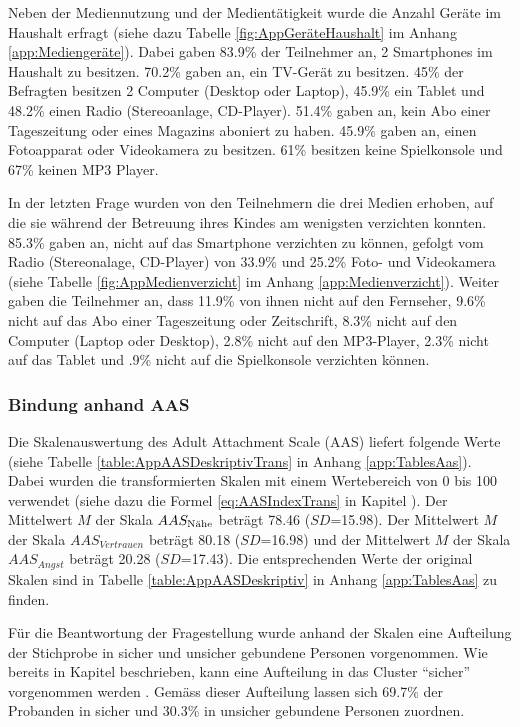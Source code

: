 Neben der Mediennutzung und der Medientätigkeit wurde die Anzahl Geräte im Haushalt erfragt (siehe dazu Tabelle \ref{fig:AppGeräteHaushalt} im Anhang \ref{app:Mediengeräte}). Dabei gaben 83.9\% der Teilnehmer an, 2 Smartphones im Haushalt zu besitzen. 70.2\% gaben an, ein TV-Gerät zu besitzen. 45\% der Befragten besitzen 2 Computer (Desktop oder Laptop), 45.9\% ein Tablet und 48.2\% einen Radio (Stereoanlage, CD-Player). 51.4\% gaben an, kein Abo einer Tageszeitung oder eines Magazins aboniert zu haben. 45.9\% gaben an, einen Fotoapparat oder Videokamera zu besitzen. 61\% besitzen keine Spielkonsole und 67\% keinen MP3 Player.

In der letzten Frage wurden von den Teilnehmern die drei Medien erhoben, auf die sie während der Betreuung ihres Kindes am wenigsten verzichten konnten. 85.3\% gaben an, nicht auf das Smartphone verzichten zu können, gefolgt vom Radio (Stereonalage, CD-Player) von 33.9\% und 25.2\% Foto- und Videokamera (siehe Tabelle \ref{fig:AppMedienverzicht} im Anhang \ref{app:Medienverzicht}). Weiter gaben die Teilnehmer an, dass 11.9\% von ihnen nicht auf den Fernseher, 9.6\% nicht auf das Abo einer Tageszeitung oder Zeitschrift, 8.3\% nicht auf den Computer (Laptop oder Desktop), 2.8\% nicht auf den MP3-Player, 2.3\% nicht auf das Tablet und .9\% nicht auf die Spielkonsole verzichten können.

\subsubsection{Bindung anhand AAS}
Die Skalenauswertung des Adult Attachment Scale (AAS) liefert folgende Werte (siehe Tabelle \ref{table:AppAASDeskriptivTrans} in Anhang \ref{app:TablesAas}). Dabei wurden die transformierten Skalen mit einem Wertebereich von 0 bis 100 verwendet (siehe dazu die Formel \ref{eq:AASIndexTrans} in Kapitel ). Der Mittelwert $M$ der Skala $AAS_{\textnormal{Nähe}}$ beträgt 78.46 ($SD$=15.98). Der Mittelwert $M$ der Skala $AAS_{Vertrauen}$ beträgt 80.18 ($SD$=16.98) und der Mittelwert  $M$ der Skala $AAS_{Angst}$ beträgt 20.28 ($SD$=17.43). Die entsprechenden Werte der original Skalen sind in Tabelle \ref{table:AppAASDeskriptiv} in Anhang \ref{app:TablesAas} zu finden.

Für die Beantwortung der Fragestellung wurde anhand der Skalen eine Aufteilung der Stichprobe in sicher und unsicher gebundene Personen vorgenommen. Wie bereits in Kapitel  beschrieben, kann eine Aufteilung in das Cluster \enquote{sicher} vorgenommen werden \cite{Schuetzmann2004}. Gemäss dieser Aufteilung lassen sich 69.7\% der Probanden in sicher und 30.3\% in unsicher gebundene Personen zuordnen. 

